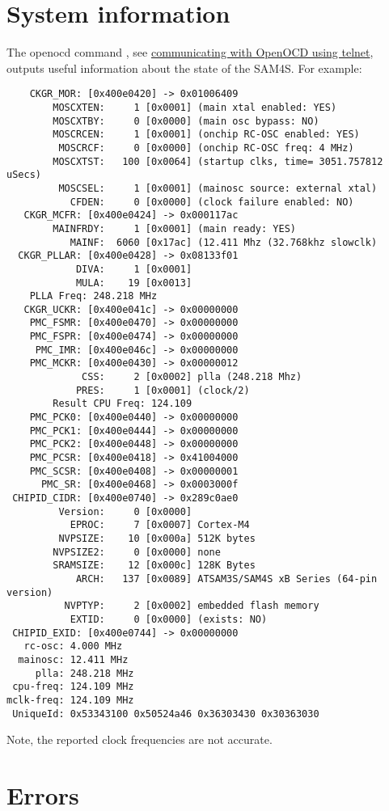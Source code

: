 \section{System information}
\label{syste-information}


The openocd command , see
\hyperref[communicating-with-openocd-using-telnet]{communicating with
  OpenOCD using telnet}, outputs useful information about the state of
the SAM4S.  For example:
%
\begin{verbatim}
    CKGR_MOR: [0x400e0420] -> 0x01006409
	    MOSCXTEN:     1 [0x0001] (main xtal enabled: YES)
	    MOSCXTBY:     0 [0x0000] (main osc bypass: NO)
	    MOSCRCEN:     1 [0x0001] (onchip RC-OSC enabled: YES)
	     MOSCRCF:     0 [0x0000] (onchip RC-OSC freq: 4 MHz)
	    MOSCXTST:   100 [0x0064] (startup clks, time= 3051.757812 uSecs)
	     MOSCSEL:     1 [0x0001] (mainosc source: external xtal)
	       CFDEN:     0 [0x0000] (clock failure enabled: NO)
   CKGR_MCFR: [0x400e0424] -> 0x000117ac
	    MAINFRDY:     1 [0x0001] (main ready: YES)
	       MAINF:  6060 [0x17ac] (12.411 Mhz (32.768khz slowclk)
  CKGR_PLLAR: [0x400e0428] -> 0x08133f01
	        DIVA:     1 [0x0001]
	        MULA:    19 [0x0013]
	PLLA Freq: 248.218 MHz
   CKGR_UCKR: [0x400e041c] -> 0x00000000
    PMC_FSMR: [0x400e0470] -> 0x00000000
    PMC_FSPR: [0x400e0474] -> 0x00000000
     PMC_IMR: [0x400e046c] -> 0x00000000
    PMC_MCKR: [0x400e0430] -> 0x00000012
	         CSS:     2 [0x0002] plla (248.218 Mhz)
	        PRES:     1 [0x0001] (clock/2)
		Result CPU Freq: 124.109
    PMC_PCK0: [0x400e0440] -> 0x00000000
    PMC_PCK1: [0x400e0444] -> 0x00000000
    PMC_PCK2: [0x400e0448] -> 0x00000000
    PMC_PCSR: [0x400e0418] -> 0x41004000
    PMC_SCSR: [0x400e0408] -> 0x00000001
      PMC_SR: [0x400e0468] -> 0x0003000f
 CHIPID_CIDR: [0x400e0740] -> 0x289c0ae0
	     Version:     0 [0x0000]
	       EPROC:     7 [0x0007] Cortex-M4
	     NVPSIZE:    10 [0x000a] 512K bytes
	    NVPSIZE2:     0 [0x0000] none
	    SRAMSIZE:    12 [0x000c] 128K Bytes
	        ARCH:   137 [0x0089] ATSAM3S/SAM4S xB Series (64-pin version)
	      NVPTYP:     2 [0x0002] embedded flash memory
	       EXTID:     0 [0x0000] (exists: NO)
 CHIPID_EXID: [0x400e0744] -> 0x00000000
   rc-osc: 4.000 MHz
  mainosc: 12.411 MHz
     plla: 248.218 MHz
 cpu-freq: 124.109 MHz
mclk-freq: 124.109 MHz
 UniqueId: 0x53343100 0x50524a46 0x36303430 0x30363030
\end{verbatim}
%
Note, the reported clock frequencies are not accurate.


\section{Errors}
\label{openocd_errors}

